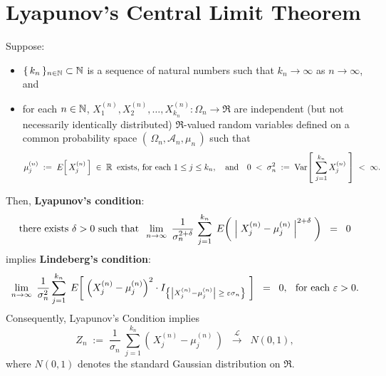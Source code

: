 
\section{Lyapunov's Central Limit Theorem}
\setcounter{theorem}{0}
\setcounter{equation}{0}

\begin{theorem}
\mbox{}\vskip 0.2cm
\noindent
Suppose:
\begin{itemize}
\item	$\{\,k_{n}\,\}_{n\in\mathbb{N}}\subset\mathbb{N}$ is a sequence of natural numbers such that $k_{n} \rightarrow \infty$ as $n \rightarrow \infty$, and
\item	for each $n \in \mathbb{N}$, $X^{(n)}_{1}, X^{(n)}_{2}, \ldots, X^{(n)}_{k_{n}} : \Omega_{n} \longrightarrow \Re$
		are {\color{red}independent} (but not necessarily identically distributed)
		$\Re$-valued random variables defined on a common probability space
		$\left(\,\Omega_{n},\mathcal{A}_{n},\mu_{n}\,\right)$ such that
		\begin{equation*}
		\mu^{(n)}_{j} \;:=\; E\!\left[\,X^{(n)}_{j}\,\right] \;\in\; \mathbb{R} \;\;\textnormal{exists, for each $1 \leq j \leq k_{n}$},
		\quad\textnormal{and}\quad
		0 \;<\; \sigma^{2}_{n} \;:=\; \textnormal{Var}\!\left[\;\overset{k_{n}}{\underset{j=1}{\sum}}\,X^{(n)}_{j}\;\right] \;<\; \infty.
		\end{equation*}
\end{itemize}
Then, \textbf{Lyapunov's condition}:
\begin{equation*}
\textnormal{there exists $\delta > 0$ such that}
\;\;
\lim_{n\rightarrow\infty}\;
\dfrac{1}{\sigma^{2+\delta}_{n}}\,
\sum_{j=1}^{k_{n}}\;
E\!\left(\;
\left\vert\;X^{(n)}_{j} - \mu^{(n)}_{j}\;\right\vert^{2+\delta}
\;\right)
\;\;=\;\; 0
\end{equation*}
implies \textbf{Lindeberg's condition}:
\begin{equation*}
\lim_{n\rightarrow\infty}\;
\dfrac{1}{\sigma^{2}_{n}}
\sum_{j=1}^{k_{n}}\;
E\!\left[\;
\left(X^{(n)}_{j} - \mu^{(n)}_{j}\right)^{2}
\cdot
I_{\left\{\left\vert X^{(n)}_{j} - \mu^{(n)}_{j}\right\vert \;\geq\; \varepsilon \sigma_{n}\right\}}
\;\right]
\;\;=\;\;
0,
\;\;\,
\textnormal{for each $\varepsilon > 0$}.
\end{equation*}
Consequently, Lyapunov's Condition implies
\begin{equation*}
Z_{n} \; := \;
\dfrac{1}{\sigma_{n}}\;\sum^{k_{n}}_{j=1}\left(\,X^{(n)}_{j} - \mu^{(n)}_{j}\,\right)
\;\;\overset{\mathcal{L}}{\longrightarrow}\;\;
N(0,1),
\end{equation*}
where $N(0,1)$ denotes the standard Gaussian distribution on $\Re$.
\vskip 0.1cm
\noindent
\vskip 0.1cm
\noindent
\end{theorem}


